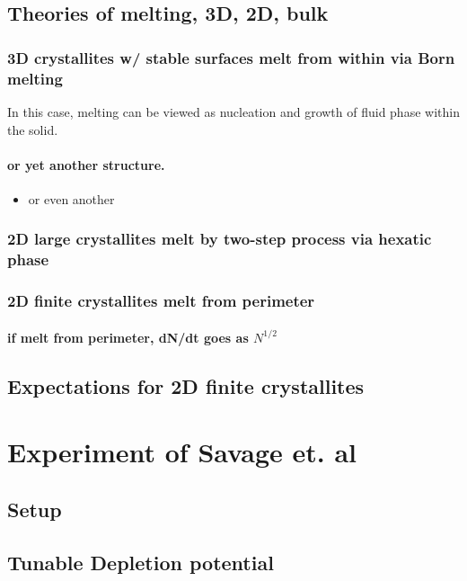 \documentclass{umthesis}
\begin{document}
\subsection{Theories of melting, 3D, 2D, bulk}
\label{sec-1.1.1}
\subsubsection{3D crystallites w/ stable surfaces melt from within via Born melting}
\label{sec-1.1.1.1}

In this case, melting can be viewed as nucleation and growth of fluid phase within the solid.
\paragraph{or yet another structure.}
\label{sec-1.1.1.1.1}
\begin{itemize}

\item or even another\\
\label{sec-1.1.1.1.1.1}%
\end{itemize} %
\subsubsection{2D large crystallites melt by two-step process via hexatic phase}
\label{sec-1.1.1.2}
\subsubsection{2D finite crystallites melt from perimeter}
\label{sec-1.1.1.3}
\paragraph{if melt from perimeter, dN/dt goes as $N^{1/2}$}
\label{sec-1.1.1.3.1}
\subsection{Expectations for 2D finite crystallites}
\label{sec-1.1.2}
\section{Experiment of Savage et. al}
\label{sec-1.2}
\subsection{Setup}
\label{sec-1.2.1}
\subsection{Tunable Depletion potential}
\label{sec-1.2.2}
\end{document}
